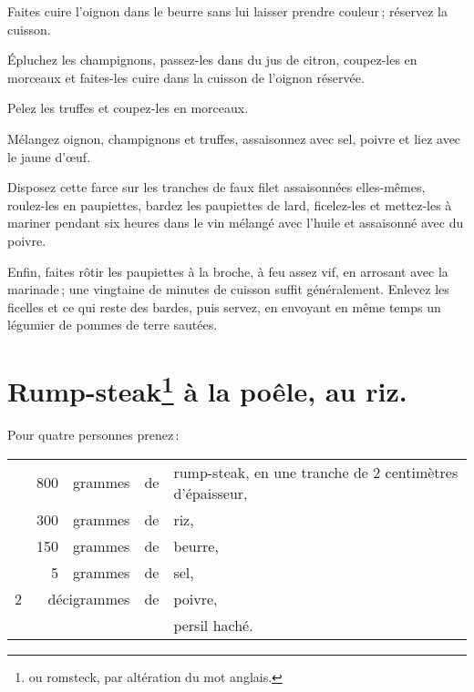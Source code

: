 Faites cuire l'oignon dans le beurre sans lui laisser prendre couleur ;
réservez la cuisson.

Épluchez les champignons, passez-les dans du jus de citron, coupez-les en
morceaux et faites-les cuire dans la cuisson de l'oignon réservée.

Pelez les truffes et coupez-les en morceaux.

Mélangez oignon, champignons et truffes, assaisonnez avec sel, poivre et liez
avec le jaune d'œuf.

Disposez cette farce sur les tranches de faux filet assaisonnées elles-mêmes,
roulez-les en paupiettes, bardez les paupiettes de lard, ficelez-les et
mettez-les à mariner pendant six heures dans le vin mélangé avec l'huile et
assaisonné avec du poivre.

Enfin, faites rôtir les paupiettes à la broche, à feu assez vif, en arrosant
avec la marinade ; une vingtaine de minutes de cuisson suffit généralement.
Enlevez les ficelles et ce qui reste des bardes, puis servez, en envoyant en
même temps un légumier de pommes de terre sautées.

\section*{\centering Rump-steak\footnote{ou romsteck, par altération du mot
anglais.} à la poêle, au riz.}
{}

Pour quatre personnes prenez :

\medskip

\footnotesize
\begin{longtable}{rrrrp{16em}}
  & 800 & grammes & de & rump-steak, en une tranche de 2 centimètres d'épaisseur,                         \\
  & 300 & grammes & de & riz,                                                                             \\
  & 150 & grammes & de & beurre,                                                                          \\
  &   5 & grammes & de & sel,                                                                             \\
2 & \multicolumn{2}{r}{décigrammes}  & de & poivre,                                                       \\
  &     &         &    & persil haché.                                                                    \\
\end{longtable}
\normalsize

